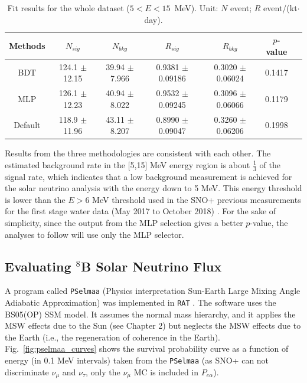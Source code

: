 \begin{table}[ht]
	\small{
	\centering
	\caption[Fit results for the whole dataset ($5<E<15$~MeV).]{Fit results for the whole dataset ($5<E<15$~MeV). Unit: $N$ event; $R$ event/(kt$\cdot$day). \label{table:wholedata_output}}
	\begin{tabular*}{150mm}{c@{\extracolsep{\fill}}cccccc}
		\toprule
		Methods & $N_{sig}$ & $N_{bkg}$ & $R_{sig}$ & $R_{bkg}$ & $p$-value\\
		\midrule
		BDT & 124.1 $\pm$ 12.15 & 39.94 $\pm$ 7.966 & 0.9381 $\pm$ 0.09186 & 0.3020 $\pm$ 0.06024 & 0.1417\\
		MLP & 126.1 $\pm$ 12.23 & 40.94 $\pm$ 8.022 & 0.9532 $\pm$ 0.09245  & 0.3096 $\pm$ 0.06066  & 0.1179\\
		Default & 118.9 $\pm$ 11.96 & 43.11 $\pm$ 8.207 & 0.8990 $\pm$ 0.09047 & 0.3260 $\pm$ 0.06206 & 0.1998\\
		\bottomrule
	\end{tabular*}
}
\end{table}

Results from the three methodologies are consistent with each other. The estimated background rate in the [5,15] MeV energy region is about $\frac{1}{3}$ of the signal rate, which indicates that a low background measurement is achieved for the solar neutrino analysis with the energy down to 5 MeV. This energy threshold is lower than the $E>6$ MeV threshold used in the SNO+ previous measurements for the first stage water data (May 2017 to October 2018) \cite{anderson2019measurement}. For the sake of simplicity, since the output from the MLP selection gives a better $p$-value, the analyses to follow will use only the MLP selector. 

\subsection{Evaluating $^8$B Solar Neutrino Flux}\label{sect:evaluateFlux}

A program called \texttt{PSelmaa} (Physics interpretation Sun-Earth Large Mixing Angle Adiabatic
Approximation) was implemented in \texttt{RAT} \cite{fady_pselmaa}. The software uses the BS05(OP) SSM model. It assumes the normal mass hierarchy, and it applies the MSW effects due to the Sun (see Chapter 2) but neglects the MSW effects due to the Earth (i.e., the regeneration of coherence in the Earth). Fig.~\ref{fig:pselmaa_curves} shows the survival probability curve as a function of energy (in 0.1 MeV intervals) taken from the \texttt{PSelmaa} (as SNO+ can not discriminate $\nu_\mu$ and $\nu_\tau$, only the $\nu_\mu$ MC is included in $P_{e\alpha}$).


